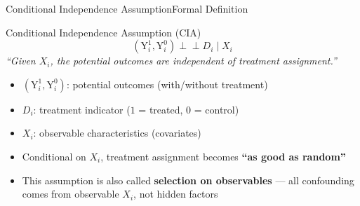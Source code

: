 \documentclass[dvipsnames,hyperref={pdfpagelabels=false}]{beamer}
\newcommand{\indep}{\perp\!\!\!\perp}
\begin{document}
\begin{frame}{Conditional Independence Assumption}{Formal Definition}

\begin{block}{Conditional Independence Assumption (CIA)}
\begin{equation*}
(\mathrm{Y}^{1}_{i},\mathrm{Y}^{0}_{i})\indep D_{i}\mid X_{i}
\end{equation*}
\textit{``Given $X_i$, the potential outcomes are independent of treatment assignment.''}
\end{block}

\vspace{0.3cm}
\begin{itemize}
    \item $(\mathrm{Y}^{1}_{i},\mathrm{Y}^{0}_{i})$: potential outcomes (with/without treatment)
    \vspace{0.2cm}
    \item $D_{i}$: treatment indicator ($1$ = treated, $0$ = control)
    \vspace{0.2cm}
    \item $X_{i}$: observable characteristics (covariates)
    \vspace{0.2cm}
    \item Conditional on $X_i$, treatment assignment becomes \textbf{``as good as random''}
    \vspace{0.2cm}
    \item This assumption is also called \textbf{selection on observables} — all confounding
    comes from observable $X_i$, not hidden factors
\end{itemize}

\end{frame}




\end{document}
